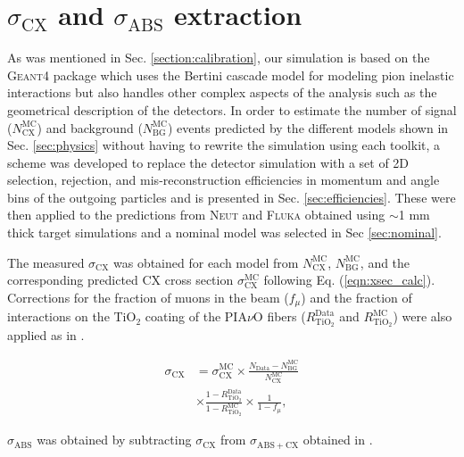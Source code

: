 \section{$\sigma_{\mathrm{CX}}$ and $\sigma_{\mathrm{ABS}}$ extraction}\label{sec:xsec}
As was mentioned in Sec. \ref{section:calibration}, our simulation is based on the \textsc{Geant4} package which uses the Bertini cascade model for modeling pion inelastic interactions but also handles other complex aspects of the analysis such as the geometrical description of the detectors. In order to estimate the number of signal ($N_{\mathrm{CX}}^{\mathrm{MC}}$) and background ($N_{\mathrm{BG}}^{\mathrm{MC}}$) events predicted by the different models shown in Sec. \ref{sec:physics} without having to rewrite the simulation using each toolkit, a scheme was developed to replace the detector simulation with a set of 2D selection, rejection, and mis-reconstruction efficiencies in momentum and angle bins of the outgoing particles and is presented in Sec. \ref{sec:efficiencies}. These were then applied to the predictions from \textsc{Neut} and \textsc{Fluka} obtained using $\sim$1 mm thick target simulations and a nominal model was selected in Sec \ref{sec:nominal}.

The measured $\sigma_{\mathrm{CX}}$ was obtained for each model from $N_{\mathrm{CX}}^{\mathrm{MC}}$, $N_{\mathrm{BG}}^{\mathrm{MC}}$, and the corresponding predicted CX cross section $\sigma_{\mathrm{CX}}^{\mathrm{MC}}$ following Eq. (\ref{eqn:xsec_calc}). Corrections for the fraction of muons in the beam ($f_{\mu}$) and the fraction of interactions on the TiO$_2$ coating of the PIA$\nu$O fibers ($R_{\mathrm{TiO}_2}^{\mathrm{Data}}$ and $R_{\mathrm{TiO}_2}^{\mathrm{MC}}$) were also applied as in \cite{duet}.

 \begin{equation} \label{eqn:xsec_calc}
 \begin{aligned}
 \sigma_{\mathrm{CX}} &= 
 \sigma_{\mathrm{CX}}^{\mathrm{MC}}
 \times \frac{N_{\mathrm{Data}}-N_{\mathrm{BG}}^{\mathrm{MC}}}{N_{\mathrm{CX}}^{\mathrm{MC}}} \\
 &\times
 \frac{1-R_{\mathrm{TiO}_2}^{\mathrm{Data}}}{1-R_{\mathrm{TiO}_2}^{\mathrm{MC}}}
 \times \frac{1}{1-f_{\mu}},
 \end{aligned}
 \end{equation} 

$\sigma_{\mathrm{ABS}}$ was obtained by subtracting $\sigma_{\mathrm{CX}}$ from $\sigma_{\mathrm{ABS+CX}}$ obtained in \cite{duet}.

